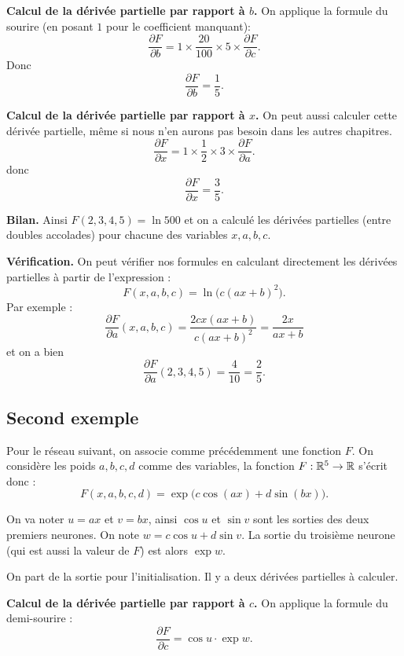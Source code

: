 {\textbf{Calcul de la dérivée partielle par rapport à $b$.}
On applique la formule du sourire (en posant $1$ pour le coefficient manquant):
$$\frac{\partial F}{\partial b} = 1 \times \frac{20}{100} \times 5 \times \frac{\partial F}{\partial c}.$$
Donc 
$$\frac{\partial F}{\partial b} = \frac15.$$

\textbf{Calcul de la dérivée partielle par rapport à $x$.}
On peut aussi calculer cette dérivée partielle, même si nous n'en aurons pas besoin dans les autres chapitres. 
$$\frac{\partial F}{\partial x} = 1 \times \frac{1}{2} \times 3 \times \frac{\partial F}{\partial a}.$$
donc 
$$\frac{\partial F}{\partial x} = \frac{3}{5}.$$

\textbf{Bilan.}
Ainsi $F(2,3,4,5)=\ln 500$ et on a calculé les dérivées partielles (entre doubles accolades) pour chacune des variables $x,a,b,c$.

\textbf{Vérification.}
On peut vérifier nos formules en calculant directement les dérivées partielles à partir de l'expression :
$$F(x,a,b,c) = \ln\big( c (ax+b)^2 \big).$$
Par exemple :
$$\frac{\partial F}{\partial a}(x,a,b,c) = \frac{2cx(ax+b)}{c(ax+b)^2} = \frac{2x}{ax+b}$$
et on a bien 
$$\frac{\partial F}{\partial a}(2,3,4,5) = \frac{4}{10} = \frac25.$$

\subsection{Second exemple}

Pour le réseau suivant, on associe comme précédemment une fonction $F$. 
On considère les poids $a,b,c,d$ comme des variables, la fonction $F : \mathbb{R}^5 \to \mathbb{R}$ s'écrit donc :
$$F(x,a,b,c,d) = \exp\big(c \cos(ax) + d\sin(bx)\big).$$

On va noter $u=ax$ et $v=bx$, ainsi $\cos u$ et $\sin v$ sont les sorties des deux premiers neurones. On note $w =c\cos u + d\sin v$. La sortie du troisième neurone (qui est aussi la valeur de $F$) est alors $\exp w$.

On part de la sortie pour l'initialisation. Il y a deux dérivées partielles à calculer.

\textbf{Calcul de la dérivée partielle par rapport à $c$.}
On applique la formule du demi-sourire :
$$\frac{\partial F}{\partial c} = \cos u \cdot \exp w.$$

}

